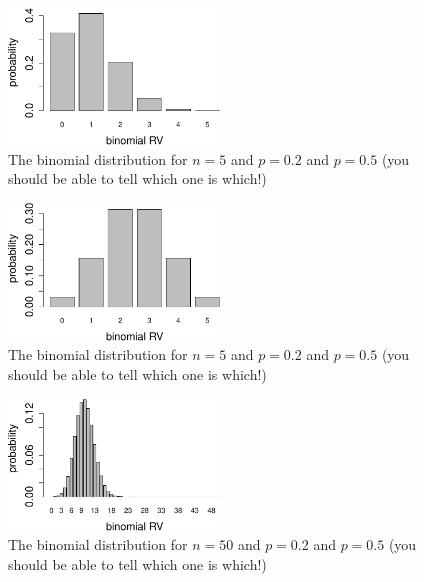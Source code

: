 \documentclass[
  letterpaper,
  DIV=11,
  numbers=noendperiod]{scrreprt}
\begin{document}
\begin{figure}

{\centering \includegraphics[width=0.5\textwidth,height=\textheight]{./probdist_files/figure-pdf/bin-dist-2-1.pdf}

}

\caption{The binomial distribution for \(n=5\) and \(p=0.2\) and
\(p=0.5\) (you should be able to tell which one is which!)}

\end{figure}

\begin{figure}

{\centering \includegraphics[width=0.5\textwidth,height=\textheight]{./probdist_files/figure-pdf/bin-dist-2-2.pdf}

}

\caption{The binomial distribution for \(n=5\) and \(p=0.2\) and
\(p=0.5\) (you should be able to tell which one is which!)}

\end{figure}

\begin{figure}

{\centering \includegraphics[width=0.5\textwidth,height=\textheight]{./probdist_files/figure-pdf/bin-dist-3-1.pdf}

}

\caption{The binomial distribution for \(n=50\) and \(p=0.2\) and
\(p=0.5\) (you should be able to tell which one is which!)}

\end{figure}
\end{document}
